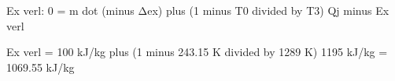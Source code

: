 Ex verl:  
0 = m dot (minus Δex) plus (1 minus T0 divided by T3) Qj minus Ex verl  

Ex verl = 100 kJ/kg plus (1 minus 243.15 K divided by 1289 K) 1195 kJ/kg  
= 1069.55 kJ/kg